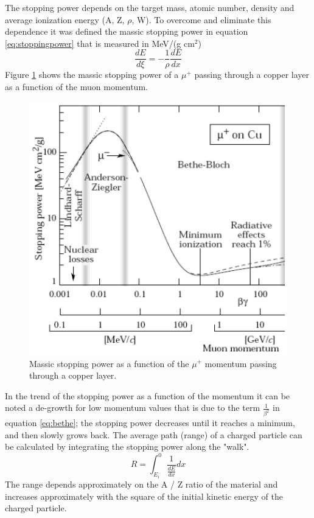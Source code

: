 \noindent The stopping power depends on the target mass, atomic number, density and average ionization energy (A, Z, $\rho$, W). To overcome and eliminate this dependence it was defined the massic stopping power in equation \ref{eq:stoppingpower} that is measured in MeV/(g cm${}^2$)
\begin{equation}\label{eq:stoppingpower}
	\frac{dE}{d \xi} = - \frac{1}{\rho} \frac{dE}{dx}
\end{equation}
\noindent Figure \ref{fig:massicstoppingpower} shows the massic stopping power of a $\mu^+$ passing through a copper layer as a function of the muon momentum.
\begin{figure}[H]
	\centering
	\includegraphics[width=0.7\linewidth]{IMG/ch1/MassicStoppingPower}
	\caption{Massic stopping power as a function of the $\mu^+$ momentum passing through a copper layer\cite{PDG}.}
	\label{fig:massicstoppingpower}
\end{figure}
\noindent In the trend of the stopping power as a function of the momentum it can be noted a de-growth for low momentum values that is due to the term $\frac{1}{\beta^2}$ in equation \ref{eq:bethe}; the stopping power decreases until it reaches a minimum, and then slowly grows back.
\newline
The average path (range) of a charged particle can be calculated by integrating the stopping power along the "walk".
\begin{equation}\label{eq:range}
	R=\int_{E_i}^{0} \frac{1}{\frac{dE}{dx}}dx
\end{equation}
\noindent The range depends approximately on the A / Z ratio of the material and increases approximately with the square of the initial kinetic energy of the charged particle.
